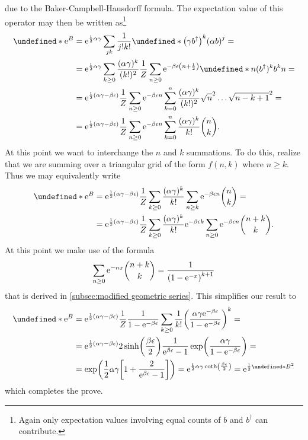\documentclass[english, parskip=full]{scrartcl}
\DeclarePairedDelimiter\kla{(}{)}
\DeclarePairedDelimiter\klam{[}{]}
\let\bra\undefined
\let\braket\undefined
\DeclarePairedDelimiter\bra{\langle}{\rangle}
\newcommand{\e}{\text{e}}
\newcommand{\powe}[1]{\e^{#1}}
\begin{document}
due to the Baker-Campbell-Hausdorff formula.
The expectation value of this operator may then be written as\footnote{Again only expectation values involving equal counts of $b$ and $b^\dagger$ can contribute.}
\begin{align}
\bra*{\powe{B}} &= \powe{\frac{1}{2} \alpha\gamma} \sum_{jk} \frac{1}{j!k!} \bra*{\kla*{\gamma b^\dagger}^k \kla*{\alpha b}^j } = \\
&= \powe{\frac{1}{2} \alpha\gamma} \sum_{k\ge 0} \frac{(\alpha\gamma)^k}{(k!)^2} \frac{1}{Z} \sum_{n\ge 0} \e^{-\beta\epsilon \kla*{n + \frac{1}{2}}} \braket*{n}{(b^\dagger)^k b^k }{n} = \\
&= \powe{\frac{1}{2}\kla*{\alpha\gamma - \beta\epsilon}} \frac{1}{Z} \sum_{n\ge 0} \e^{-\beta\epsilon n} \sum_{k=0}^n \frac{(\alpha\gamma)^k}{(k!)^2} \sqrt{n}^2 \dots \sqrt{n - k + 1}^2 = \\
&= \powe{\frac{1}{2}\kla*{\alpha\gamma - \beta\epsilon}} \frac{1}{Z} \sum_{n\ge 0} \e^{-\beta\epsilon n} \sum_{k=0}^n \frac{(\alpha\gamma)^k}{k!} \binom{n}{k}.
\end{align}
At this point we want to interchange the $n$ and $k$ summations. 
To do this, realize that we are summing over a triangular grid of the form $f(n,k)$ where $n \ge k$.
Thus we may equivalently write
\begin{align}
\bra*{\e^B} &= \powe{\frac{1}{2} \kla*{\alpha\gamma - \beta\epsilon}} \frac{1}{Z} \sum_{k\ge 0} \frac{(\alpha\gamma)^k}{k!} \sum_{n\ge k} \e^{-\beta\epsilon n} \binom{n}{k} = \\
&= \powe{\frac{1}{2} \kla*{\alpha\gamma - \beta\epsilon}} \frac{1}{Z} \sum_{k\ge 0} \frac{(\alpha\gamma)^k}{k!} \e^{-\beta\epsilon k} \sum_{n\ge 0} \e^{-\beta\epsilon n} \binom{n+k}{k}.
\end{align}
At this point we make use of the formula 
\begin{align}
\sum_{n\ge 0} \e^{-nx} \binom{n+k}{k} = \frac{1}{\kla*{1 - \powe{-x}}^{k+1}}
\end{align}
that is derived in \autoref{subsec:modified geometric series}.
This simplifies our result to
\begin{align}
\bra*{\e^B} &= \powe{\frac{1}{2} \kla*{\alpha\gamma - \beta\epsilon}} \frac{1}{Z}  \frac{1}{1 - \powe{-\beta\epsilon}} \sum_{k\ge 0} \frac{1}{k!} \kla*{\frac{\alpha\gamma \powe{-\beta\epsilon}}{1 - \powe{-\beta\epsilon}}}^k = \\
&= \powe{\frac{1}{2} \kla*{\alpha\gamma - \beta\epsilon}} 2\sinh\kla*{\frac{\beta\epsilon}{2}} \frac{1}{\powe{\beta\epsilon} - 1} \exp\kla*{\frac{\alpha\gamma}{1 - \e^{-\beta\epsilon}}} = \\
&= \exp\kla*{\frac{1}{2} \alpha\gamma \klam*{1 +  \frac{2}{\powe{\beta\epsilon} - 1}} } = \powe{\frac{1}{2}\alpha\gamma \coth\kla*{\frac{\beta\epsilon}{2}}} = \powe{\frac{1}{2} \bra*{B^2}}
\end{align}
which completes the prove.
\end{document}
